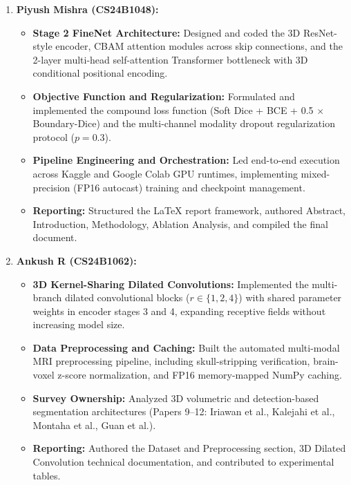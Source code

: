 \documentclass[12pt, a4paper]{article}
\begin{document}
\begin{enumerate}[leftmargin=*, itemsep=10pt]
    \item \textbf{Piyush Mishra (CS24B1048):}
    \begin{itemize}[leftmargin=*, itemsep=3pt]
        \item \textbf{Stage 2 FineNet Architecture:} Designed and coded the 3D ResNet-style encoder, CBAM attention modules across skip connections, and the 2-layer multi-head self-attention Transformer bottleneck with 3D conditional positional encoding.
        \item \textbf{Objective Function and Regularization:} Formulated and implemented the compound loss function (Soft Dice + BCE + 0.5 $\times$ Boundary-Dice) and the multi-channel modality dropout regularization protocol ($p=0.3$).
        \item \textbf{Pipeline Engineering and Orchestration:} Led end-to-end execution across Kaggle and Google Colab GPU runtimes, implementing mixed-precision (FP16 autocast) training and checkpoint management.
        \item \textbf{Reporting:} Structured the LaTeX report framework, authored Abstract, Introduction, Methodology, Ablation Analysis, and compiled the final document.
    \end{itemize}

    \item \textbf{Ankush R (CS24B1062):}
    \begin{itemize}[leftmargin=*, itemsep=3pt]
        \item \textbf{3D Kernel-Sharing Dilated Convolutions:} Implemented the multi-branch dilated convolutional blocks ($r \in \{1, 2, 4\}$) with shared parameter weights in encoder stages 3 and 4, expanding receptive fields without increasing model size.
        \item \textbf{Data Preprocessing and Caching:} Built the automated multi-modal MRI preprocessing pipeline, including skull-stripping verification, brain-voxel z-score normalization, and FP16 memory-mapped NumPy caching.
        \item \textbf{Survey Ownership:} Analyzed 3D volumetric and detection-based segmentation architectures (Papers 9--12: Iriawan et al., Kalejahi et al., Montaha et al., Guan et al.).
        \item \textbf{Reporting:} Authored the Dataset and Preprocessing section, 3D Dilated Convolution technical documentation, and contributed to experimental tables.
    \end{itemize}


\end{enumerate}
\end{document}
